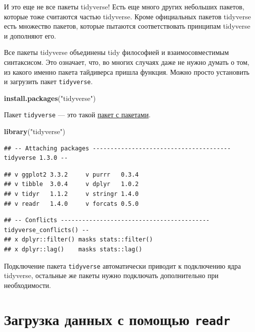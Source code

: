 \documentclass[]{book}
\newenvironment{Shaded}{\begin{snugshade}}{\end{snugshade}}
\newcommand{\KeywordTok}[1]{\textcolor[rgb]{0.13,0.29,0.53}{\textbf{#1}}}
\newcommand{\StringTok}[1]{\textcolor[rgb]{0.31,0.60,0.02}{#1}}
\newcommand{\NormalTok}[1]{#1}
\begin{document}
И это еще не все пакеты tidyverse! Есть еще много других небольших
пакетов, которые тоже считаются частью tidyverse. Кроме официальных
пакетов tidyverse есть множество пакетов, которые пытаются
соответствовать принципам tidyverse и дополняют его.

Все пакеты tidyverse объединены tidy философией и взаимосовместимым
синтаксисом. Это означает, что, во многих случаях даже не нужно думать о
том, из какого именно пакета тайдиверса пришла функция. Можно просто
установить и загрузить пакет \texttt{tidyverse}.

\begin{Shaded}
\begin{Highlighting}[]
\KeywordTok{install.packages}\NormalTok{(}\StringTok{"tidyverse"}\NormalTok{)}
\end{Highlighting}
\end{Shaded}

Пакет \texttt{tidyverse} --- это такой
\href{https://cs11.pikabu.ru/post_img/big/2019/03/12/11/1552415351186680692.jpg}{пакет
с пакетами}.

\begin{Shaded}
\begin{Highlighting}[]
\KeywordTok{library}\NormalTok{(}\StringTok{"tidyverse"}\NormalTok{)}
\end{Highlighting}
\end{Shaded}

\begin{verbatim}
## -- Attaching packages --------------------------------------- tidyverse 1.3.0 --
\end{verbatim}

\begin{verbatim}
## v ggplot2 3.3.2     v purrr   0.3.4
## v tibble  3.0.4     v dplyr   1.0.2
## v tidyr   1.1.2     v stringr 1.4.0
## v readr   1.4.0     v forcats 0.5.0
\end{verbatim}

\begin{verbatim}
## -- Conflicts ------------------------------------------ tidyverse_conflicts() --
## x dplyr::filter() masks stats::filter()
## x dplyr::lag()    masks stats::lag()
\end{verbatim}

Подключение пакета \texttt{tidyverse} автоматически приводит к
подключению ядра tidyverse, остальные же пакеты нужно подключать
дополнительно при необходимости.

\section{\texorpdfstring{Загрузка данных с помощью
\texttt{readr}}{Загрузка данных с помощью readr}}\label{ux437ux430ux433ux440ux443ux437ux43aux430-ux434ux430ux43dux43dux44bux445-ux441-ux43fux43eux43cux43eux449ux44cux44e-readr}
\end{document}

